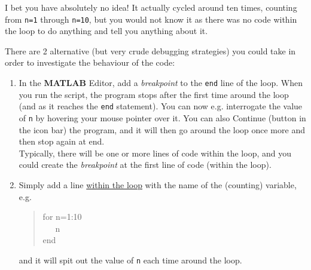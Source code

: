 \documentclass{tufte-book} %
\newenvironment{docspec}{\begin{quotation}\ttfamily\parskip0pt\parindent0pt\ignorespaces}{\end{quotation}}
\begin{document}
I bet you have absolutely no idea! It actually cycled around ten times, counting from \texttt{n=1} through \texttt{n=10}, but you would not know it as there was no code within the loop to do anything and tell you anything about it.

There are 2 alternative (but very crude debugging strategies) you could take in order to investigate the behaviour of the code:

\begin{enumerate}[noitemsep]
\setlength{\itemindent}{.2in}

\item In the \textbf{MATLAB} \textsf{Editor}, add a \textit{breakpoint} to the \texttt{end} line of the loop. When you run the script, the program stops after the first time around the loop (and as it reaches the \texttt{end} statement). You can now e.g. interrogate the value of \texttt{n} by hovering your mouse pointer over it. You can also \textsf{Continue} (button in the icon bar) the program, and it will then go around the loop once more and then stop again at end. 
\\Typically, there will be one or more lines of code within the loop, and you could create the \textit{breakpoint} at the first line of code (within the loop).

\item Simply add a line \uline{within the loop} with the name of the (counting) variable, e.g.
\begin{docspec}
for n=1:10
\\ \ \ \ n
\\end
\end{docspec}
and it will spit out the value of \texttt{n} each time around the loop.


\end{enumerate}
\end{document}
